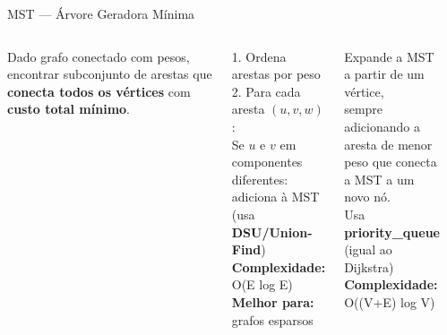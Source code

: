 \documentclass[aspectratio=169,10pt]{beamer}
\begin{document}
\begin{frame}[fragile]{MST --- Árvore Geradora Mínima}
  \begin{columns}[c]
      \begin{tcolorbox}[caixaAzul,title={O que é MST?}]
        \small
        Dado grafo conectado com pesos,
        encontrar subconjunto de arestas que
        \textbf{conecta todos os vértices}
        com \textbf{custo total mínimo}.
      \end{tcolorbox}
      \vspace{0.08cm}
      \begin{tcolorbox}[caixaGrafo,title={Kruskal}]
        \footnotesize
        1. Ordena arestas por peso\\
        2. Para cada aresta $(u,v,w)$:\\
        \quad Se $u$ e $v$ em componentes diferentes:\\
        \quad\quad adiciona à MST (usa \textbf{DSU/Union-Find})\\[3pt]
        \textbf{Complexidade:} O(E log E)\\
        \textbf{Melhor para:} grafos esparsos
      \end{tcolorbox}
      \vspace{0.08cm}
      \begin{tcolorbox}[caixaDfs,title={Prim}]
        \footnotesize
        Expande a MST a partir de um vértice,\\
        sempre adicionando a aresta de menor\\
        peso que conecta a MST a um novo nó.\\[3pt]
        Usa \textbf{priority\_queue} (igual ao Dijkstra)\\
        \textbf{Complexidade:} O((V+E) log V)
      \end{tcolorbox}
      \centering
      \begin{tcolorbox}[caixaAmarelo,title={Exemplo MST}]
        \centering\footnotesize
\end{tcolorbox}
\end{columns}
\end{frame}
\end{document}
